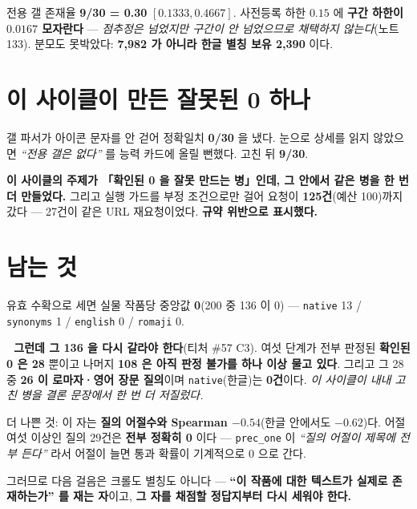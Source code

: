 \documentclass[10pt]{article}
\begin{document}
전용 갤 존재율 \textbf{9/30 = 0.30} $[0.1333, 0.4667]$. 사전등록 하한
$0.15$ 에 \textbf{구간 하한이 $0.0167$ 모자란다} --- \emph{점추정은 넘었지만
구간이 안 넘었으므로 채택하지 않는다}(노트 133). 분모도 못박았다: \textbf{7,982
가 아니라 한글 별칭 보유 2,390} 이다.

\section{이 사이클이 만든 잘못된 0 하나}

갤 파서가 아이콘 문자를 안 걷어 정확일치 \textbf{0/30} 을 냈다. 눈으로 상세를
읽지 않았으면 \emph{``전용 갤은 없다''} 를 능력 카드에 올릴 뻔했다. 고친 뒤
\textbf{9/30}.

\textbf{이 사이클의 주제가 「확인된 0 을 잘못 만드는 병」인데, 그 안에서 같은
병을 한 번 더 만들었다.} 그리고 실행 가드를 부정 조건으로만 걸어 요청이
\textbf{125건}(예산 100)까지 갔다 --- 27건이 같은 URL 재요청이었다.
\textbf{규약 위반으로 표시했다.}

\section{남는 것}

유효 수확으로 세면 실물 작품당 중앙값 \textbf{0}(200 중 136 이 0) ---
\texttt{native} 13 / \texttt{synonyms} 1 / \texttt{english} 0 /
\texttt{romaji} 0.

\textbf{🔴 그런데 그 136 을 다시 갈라야 한다}(티처 \#57 C3). 여섯 단계가 전부
판정된 \textbf{확인된 0 은 28} 뿐이고 나머지 \textbf{108 은 아직 판정 불가를
하나 이상 물고 있다}. 그리고 그 28 중 \textbf{26 이 로마자·영어 장문 질의}이며
\texttt{native}(한글)는 \textbf{0건}이다. \emph{이 사이클이 내내 고친 병을
결론 문장에서 한 번 더 저질렀다.}

더 나쁜 것: 이 자는 \textbf{질의 어절수와 Spearman $-0.54$}(한글 안에서도
$-0.62$)다. 어절 여섯 이상인 질의 29건은 \textbf{전부 정확히 0} 이다 ---
\texttt{prec\_one} 이 \emph{``질의 어절이 제목에 전부 든다''} 라서 어절이 늘면
통과 확률이 기계적으로 0 으로 간다.


그러므로 다음 걸음은 크롤도 별칭도 아니다 --- \textbf{``이 작품에 대한 텍스트가
실제로 존재하는가'' 를 재는 자}이고, \textbf{그 자를 채점할 정답지부터 다시
세워야 한다.}
\end{document}
